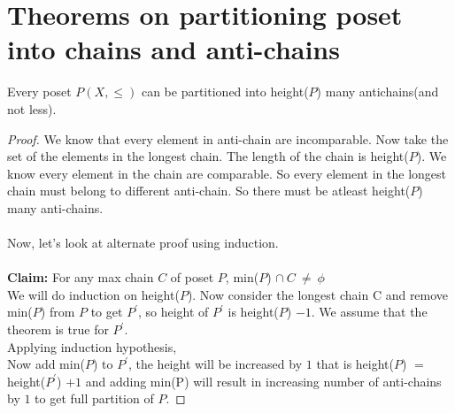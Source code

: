 \section{Theorems on partitioning poset into chains and anti-chains}
\begin{theorem}
Every poset $P(X,\leq)$ can be partitioned into height($P$) many antichains(and not less).
\begin{proof}
We know that every element in anti-chain are incomparable. Now take the set of the elements in the longest chain. The length of the chain is height($P$). We know every element in the chain are comparable. So every element in the longest chain must belong to different anti-chain. So there must be atleast height($P$) many anti-chains.
\\\\
Now, let's look at alternate proof using induction.\\\\
\textbf{Claim:} For any max chain $C$ of poset $P$, min($P$) $\cap ~ C ~\neq~ \phi$\\
We will do induction on height($P$). Now consider the longest chain C and remove min($P$) from $P$ to get $P^'$, so height of $P^'$ is height($P$) $ - 1$. We assume that the theorem is true for $P^'$.\\
Applying induction hypothesis,\\
Now add min($P$) to $P^'$, the height will be increased by $1$ that is height($P$) $=$ height($P^'$) $+ 1$ and adding min(P) will result in increasing number of anti-chains by $1$ to get full partition of $P$.
\end{proof}
\end{theorem}
